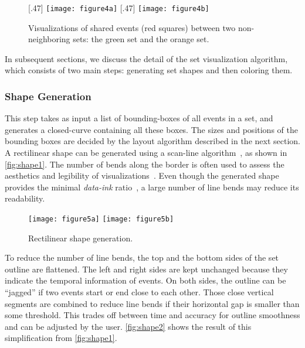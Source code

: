 \begin{figure}[!htb]
	\centering
	[.47\columnwidth]
	{\texttt{[image: figure4a]}}
	\hfill
	[.47\columnwidth]
	{\texttt{[image: figure4b]}}
	\caption[Visualizations of shared events]{Visualizations of shared events (red squares) between two non-neighboring sets: the green set and the orange set.}
	\label{fig:layering-compare}
\end{figure}

In subsequent sections, we discuss the detail of the set visualization algorithm, which consists of two main steps: generating set shapes and then coloring them.

\subsubsection{Shape Generation}
\label{sub:shapesgeneration}
This step takes as input a list of bounding-boxes of all events in a set, and generates a closed-curve containing all these boxes. The sizes and positions of the bounding boxes are decided by the layout algorithm described in the next section. A rectilinear shape can be generated using a scan-line algorithm~\cite{Foley1997}, as shown in \autoref{fig:shape1}. The number of bends along the border is often used to assess the aesthetics and legibility of visualizations~\cite{Tanahashi2012}. Even though the generated shape provides the minimal \textit{data-ink} ratio~\cite{Tufte1983}, a large number of line bends may reduce its readability.

\begin{figure}[!htb]
	\centering
	{\texttt{[image: figure5a]}}
	\hfill
	{\texttt{[image: figure5b]}}
	\caption{Rectilinear shape generation.}
	\label{fig:shape}
\end{figure}

To reduce the number of line bends, the top and the bottom sides of the set outline are flattened. The left and right sides  are kept unchanged because they indicate the temporal information of events. On both sides, the outline can be ``jagged'' if two events start or end close to each other. Those close vertical segments are combined to reduce line bends if their horizontal gap is smaller than some threshold. This trades off between time and accuracy for outline smoothness and can be adjusted by the user. \autoref{fig:shape2} shows the result of this simplification from \autoref{fig:shape1}.

